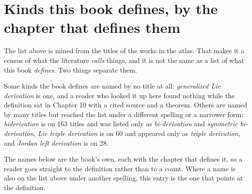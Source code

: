 \section*{Kinds this book defines, by the chapter that defines them}

The list above is mined from the titles of the works in the atlas. That makes it
a census of what the literature \emph{calls} things, and it is not the same as
a list of what this book \emph{defines}. Two things separate them.

Some kinds the book defines are named by no title at all: \emph{generalized Lie
derivation} is one, and a reader who looked it up here found nothing while the
definition sat in Chapter 10 with a cited source and a theorem. Others are named
by many titles but reached the list under a different spelling or a narrower
form: \emph{biderivation} is on 163 titles and was listed only as
\emph{bi-derivation} and \emph{symmetric bi-derivation}, \emph{Lie triple
derivation} is on 60 and appeared only as \emph{triple derivation}, and
\emph{Jordan left derivation} is on 28.

The names below are the book's own, each with the chapter that defines it, so a
reader goes straight to the definition rather than to a count. Where a name is
also on the list above under another spelling, this entry is the one that points
at the definition.

